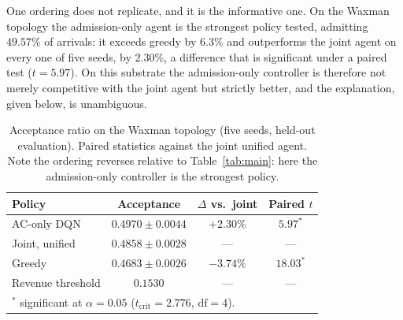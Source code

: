 \documentclass[10pt,journal,comsoc]{IEEEtran}
\begin{document}
One ordering does not replicate, and it is the informative one. On the
Waxman topology the admission-only agent is the strongest policy tested,
admitting $49.57\%$ of arrivals: it exceeds greedy by $6.3\%$ and
outperforms the joint agent on every one of five seeds, by $2.30\%$, a
difference that is significant under a paired test ($t=5.97$). On this
substrate the admission-only controller is therefore not merely
competitive with the joint agent but strictly better, and the explanation,
given below, is unambiguous.

\begin{table}[t]
\centering
\caption{Acceptance ratio on the Waxman topology (five seeds, held-out
evaluation). Paired statistics against the joint unified agent. Note the
ordering reverses relative to Table~\ref{tab:main}: here the
admission-only controller is the strongest policy.}
\label{tab:topo2}
\renewcommand{\arraystretch}{1.2}
\begin{tabular}{lccc}
\toprule
\textbf{Policy} & \textbf{Acceptance} & \textbf{$\Delta$ vs.\ joint} & \textbf{Paired $t$} \\
\midrule
AC-only DQN        & $\mathbf{0.4970 \pm 0.0044}$ & $+2.30\%$ & $5.97^{*}$ \\
Joint, unified     & $0.4858 \pm 0.0028$ & --- & --- \\
Greedy             & $0.4683 \pm 0.0026$ & $-3.74\%$ & $18.03^{*}$ \\
Revenue threshold  & $0.1530$ & --- & --- \\
\bottomrule
\multicolumn{4}{l}{\footnotesize $^{*}$ significant at $\alpha=0.05$ ($t_{\text{crit}}=2.776$, $\mathrm{df}=4$).}
\end{tabular}
\end{table}
\end{document}
